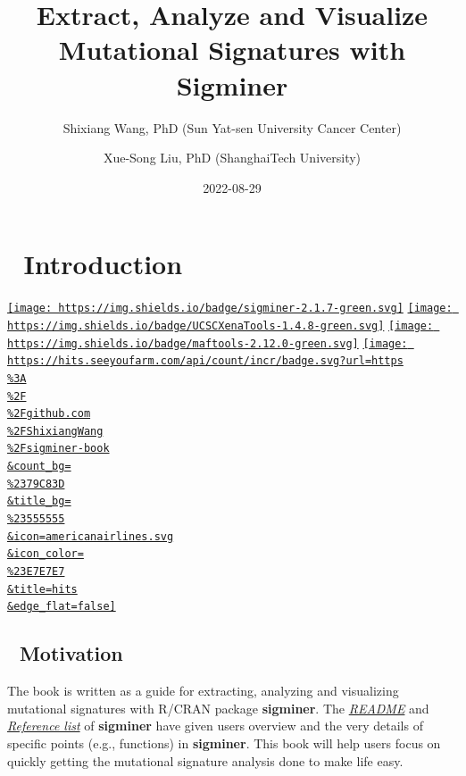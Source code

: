 \documentclass[
  12pt,
  a4paper,
  twoside]{book}
\title{Extract, Analyze and Visualize Mutational Signatures with Sigminer}
\author{Shixiang Wang, PhD (Sun Yat-sen University Cancer Center) \and Xue-Song Liu, PhD (ShanghaiTech University)}
\date{2022-08-29}
\begin{document}
\maketitle

{
\setcounter{tocdepth}{2}
\tableofcontents
}
\hypertarget{introduction}{%
\chapter*{📖 Introduction}\label{introduction}}

\href{\%5Bsigminer\%5D(https://CRAN.R-project.org/package=sigminer)}{\texttt{[image: https://img.shields.io/badge/sigminer-2.1.7-green.svg]}}
\href{\%5BUCSCXenaTools\%5D(https://CRAN.R-project.org/package=UCSCXenaTools)}{\texttt{[image: https://img.shields.io/badge/UCSCXenaTools-1.4.8-green.svg]}}
\href{\%5Bmaftools\%5D(http://bioconductor.org/packages/maftools)}{\texttt{[image: https://img.shields.io/badge/maftools-2.12.0-green.svg]}}
\href{https://hits.seeyoufarm.com}{\texttt{[image: https://hits.seeyoufarm.com/api/count/incr/badge.svg?url=https\\\%3A\\\%2F\\\%2Fgithub.com\\\%2FShixiangWang\\\%2Fsigminer-book\\\&count\_bg=\\\%2379C83D\\\&title\_bg=\\\%23555555\\\&icon=americanairlines.svg\\\&icon\_color=\\\%23E7E7E7\\\&title=hits\\\&edge\_flat=false]}}

\hypertarget{motivation}{%
\section*{🎯 Motivation}\label{motivation}}

The book is written as a guide for extracting, analyzing and visualizing mutational signatures with R/CRAN package \textbf{sigminer}. The \href{https://github.com/ShixiangWang/sigminer/blob/master/README.md}{\emph{README}} and \href{https://shixiangwang.github.io/sigminer/reference/index.html}{\emph{Reference list}} of \textbf{sigminer} have given users overview and the very details of specific points (e.g., functions) in \textbf{sigminer}. This book will help users focus on quickly getting the mutational signature analysis done to make life easy.
\end{document}
